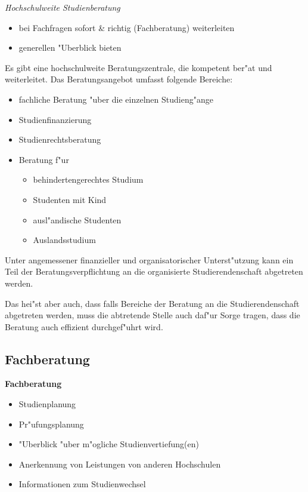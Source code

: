 \begin{kcmt}\begin{komacmt}
\emph{Hochschulweite Studienberatung}
\begin{itemize}
	\item bei Fachfragen sofort \& richtig (Fachberatung) weiterleiten
	\item generellen "Uberblick bieten
\end{itemize}
\end{komacmt}\end{kcmt}

Es gibt eine hochschulweite Beratungszentrale, die kompetent ber"at und weiterleitet.
Das Beratungsangebot umfasst folgende Bereiche:
\begin{itemize}
	\item fachliche Beratung "uber die einzelnen Studieng"ange
	\item Studienfinanzierung
	\item Studienrechtsberatung
	\item Beratung f"ur
		\begin{itemize}
			\item behindertengerechtes Studium
			\item Studenten mit Kind
			\item ausl"andische Studenten
			\item Auslandsstudium
		\end{itemize}
\end{itemize}

Unter angemessener finanzieller und organisatorischer Unterst"utzung kann ein 
Teil der Beratungsverpflichtung an die organisierte Studierendenschaft abgetreten werden.

\begin{kcmt}\begin{komacmt}
	Das hei"st aber auch, dass falls Bereiche der Beratung an die
	Studierendenschaft abgetreten werden, muss die abtretende Stelle
	auch daf"ur Sorge tragen, dass die Beratung auch effizient
	durchgef"uhrt wird.
\end{komacmt}\end{kcmt}

\subsection{Fachberatung}

\begin{kcmt}\begin{komacmt}
\textbf{Fachberatung}
\begin{itemize}
	\item Studienplanung
	\item Pr"ufungsplanung
	\item "Uberblick "uber m"ogliche Studienvertiefung(en)
	\item Anerkennung von Leistungen von anderen Hochschulen
	\item Informationen zum Studienwechsel
\end{itemize}
\end{komacmt}\end{kcmt}


